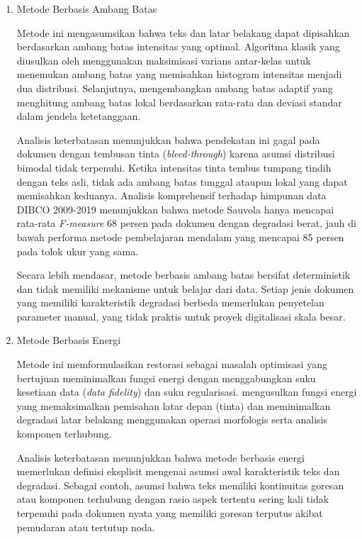 \documentclass[12pt,a4paper]{article}
\begin{document}
\begin{enumerate}[leftmargin=*, labelindent=0pt, itemsep=1ex, topsep=0pt]

\item Metode Berbasis Ambang Batas
\label{para:metode-threshold}

Metode ini mengasumsikan bahwa teks dan latar belakang dapat dipisahkan berdasarkan ambang batas intensitas yang optimal. Algoritma klasik yang diusulkan oleh \parencite{otsu1979} menggunakan maksimisasi varians antar-kelas untuk menemukan ambang batas yang memisahkan histogram intensitas menjadi dua distribusi. Selanjutnya, \parencite{sauvola2000} mengembangkan ambang batas adaptif yang menghitung ambang batas lokal berdasarkan rata-rata dan deviasi standar dalam jendela ketetanggaan.

Analisis keterbatasan menunjukkan bahwa pendekatan ini gagal pada dokumen dengan tembusan tinta (\textit{bleed-through}) karena asumsi distribusi bimodal tidak terpenuhi. Ketika intensitas tinta tembus tumpang tindih dengan teks asli, tidak ada ambang batas tunggal ataupun lokal yang dapat memisahkan keduanya. Analisis komprehensif \parencite{pratikakis2013} terhadap himpunan data DIBCO 2009-2019 menunjukkan bahwa metode Sauvola hanya mencapai rata-rata \textit{F-measure} 68 persen pada dokumen dengan degradasi berat, jauh di bawah performa metode pembelajaran mendalam yang mencapai 85 persen pada tolok ukur yang sama.

Secara lebih mendasar, metode berbasis ambang batas bersifat deterministik dan tidak memiliki mekanisme untuk belajar dari data. Setiap jenis dokumen yang memiliki karakteristik degradasi berbeda memerlukan penyetelan parameter manual, yang tidak praktis untuk proyek digitalisasi skala besar.

\item Metode Berbasis Energi
\label{para:metode-energi}

Metode ini memformulasikan restorasi sebagai masalah optimisasi yang bertujuan meminimalkan fungsi energi dengan menggabungkan suku kesetiaan data (\textit{data fidelity}) dan suku regularisasi. \parencite{gatos2006} mengusulkan fungsi energi yang memaksimalkan pemisahan latar depan (tinta) dan meminimalkan degradasi latar belakang menggunakan operasi morfologis serta analisis komponen terhubung.

Analisis keterbatasan menunjukkan bahwa metode berbasis energi memerlukan definisi eksplisit mengenai asumsi awal karakteristik teks dan degradasi. Sebagai contoh, asumsi bahwa teks memiliki kontinuitas goresan atau komponen terhubung dengan rasio aspek tertentu sering kali tidak terpenuhi pada dokumen nyata yang memiliki goresan terputus akibat pemudaran atau tertutup noda.


\end{enumerate}
\end{document}
